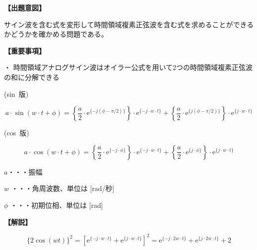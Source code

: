 \noindent \textbf{【出題意図】}

\bigskip
\noindent サイン波を含む式を変形して時間領域複素正弦波を含む式を求めることができるかどうかを確かめる問題である。

\vspace{1em}
\noindent \textbf{【重要事項】}

\medskip
\noindent ・ 時間領域アナログサイン波はオイラー公式を用いて2つの時間領域複素正弦波の和に分解できる

\medskip
\noindent \mbox{(sin 版)}

\[
a \cdot \sin ( w \cdot t + \phi )
=  \left \{ \frac{a}{2} \cdot \textrm{e}^{\{-j (\phi-\pi/2) \}} \right \} \cdot \textrm{e}^{\{-j \cdot w \cdot t \}}
+  \left \{ \frac{a}{2} \cdot \textrm{e}^{\{j (\phi-\pi/2) \}} \right \} \cdot \textrm{e}^{\{j \cdot w \cdot t \}}
\]

\medskip
\noindent \mbox{(cos 版)}

\[
a \cdot \cos ( w \cdot t + \phi )
=  \left \{ \frac{a}{2} \cdot \textrm{e}^{\{-j \cdot \phi \}} \right \} \cdot \textrm{e}^{\{-j \cdot w \cdot t \}}
+  \left \{ \frac{a}{2} \cdot \textrm{e}^{\{j  \cdot \phi \}} \right \} \cdot \textrm{e}^{\{j \cdot w \cdot t \}}
\]

\bigskip
\noindent  $a$・・・振幅

\bigskip
\noindent $w$ ・・・角周波数、単位は [rad/秒]

\bigskip
\noindent $\phi$ ・・・初期位相、単位は [rad]

\bigskip

\vspace{1em}
\noindent \textbf{【解説】}

\bigskip

\[
\{2 \cos (wt) \}^2 = 
\left [ \textrm{e}^{\{-j \cdot w \cdot t \}} 
+ \textrm{e}^{\{j \cdot w \cdot t \}} 
\right ]^2
=
\textrm{e}^{\{-j \cdot 2w \cdot t \}}
+\textrm{e}^{\{ j \cdot 2w \cdot t \}}
+2
\]
